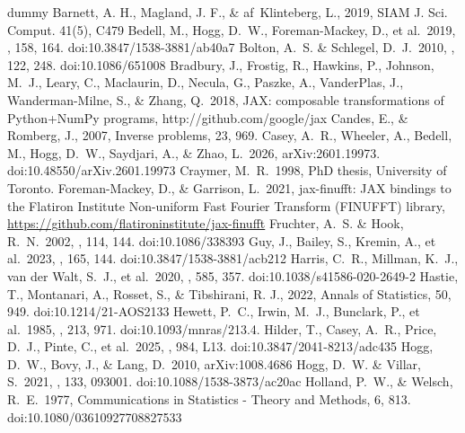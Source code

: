 \documentclass[modern, linenumbers]{aastex631}
\begin{document}
\begin{thebibliography}{dummy}
Barnett, A. H., Magland, J. F., \& af~Klinteberg, L., 2019, SIAM J. Sci. Comput. 41(5), C479
 Bedell, M., Hogg, D.~W., Foreman-Mackey, D., et al.\ 2019, \aj, 158, 164. doi:10.3847/1538-3881/ab40a7
 Bolton, A.~S. \& Schlegel, D.~J.\ 2010, \pasp, 122, 248. doi:10.1086/651008
 Bradbury, J., Frostig, R., Hawkins, P., Johnson, M.~J., Leary, C., Maclaurin, D., Necula, G., Paszke, A., VanderPlas, J., Wanderman-Milne, S., \& Zhang, Q.\ 2018, JAX: composable transformations of Python+NumPy programs, http://github.com/google/jax
 Candes, E., \& Romberg, J., 2007, Inverse problems, 23, 969.
 Casey, A.~R., Wheeler, A., Bedell, M., Hogg, D.~W., Saydjari, A., \& Zhao, L.\ 2026, arXiv:2601.19973. doi:10.48550/arXiv.2601.19973
 Craymer, M.~R.\ 1998, PhD thesis, University of Toronto.
 Foreman-Mackey, D., \& Garrison, L.\ 2021, jax-finufft: JAX bindings to the Flatiron Institute Non-uniform Fast Fourier Transform (FINUFFT) library, \url{https://github.com/flatironinstitute/jax-finufft}
 Fruchter, A.~S. \& Hook, R.~N.\ 2002, \pasp, 114, 144. doi:10.1086/338393
 Guy, J., Bailey, S., Kremin, A., et al.\ 2023, \aj, 165, 144. doi:10.3847/1538-3881/acb212
 Harris, C.~R., Millman, K.~J., van der Walt, S.~J., et al.\ 2020, \nat, 585, 357. doi:10.1038/s41586-020-2649-2
 Hastie, T., Montanari, A., Rosset, S., \& Tibshirani, R. J., 2022, Annals of Statistics, 50, 949. doi:10.1214/21-AOS2133
 Hewett, P.~C., Irwin, M.~J., Bunclark, P., et al.\ 1985, \mnras, 213, 971. doi:10.1093/mnras/213.4.
 Hilder, T., Casey, A.~R., Price, D.~J., Pinte, C., et al.\ 2025, \apjl, 984, L13. doi:10.3847/2041-8213/adc435
 Hogg, D.~W., Bovy, J., \& Lang, D.\ 2010, arXiv:1008.4686
 Hogg, D.~W. \& Villar, S.\ 2021, \pasp, 133, 093001. doi:10.1088/1538-3873/ac20ac
 Holland, P.~W., \& Welsch, R.~E.\ 1977, Communications in Statistics - Theory and Methods, 6, 813. doi:10.1080/03610927708827533

\end{thebibliography}
\end{document}
